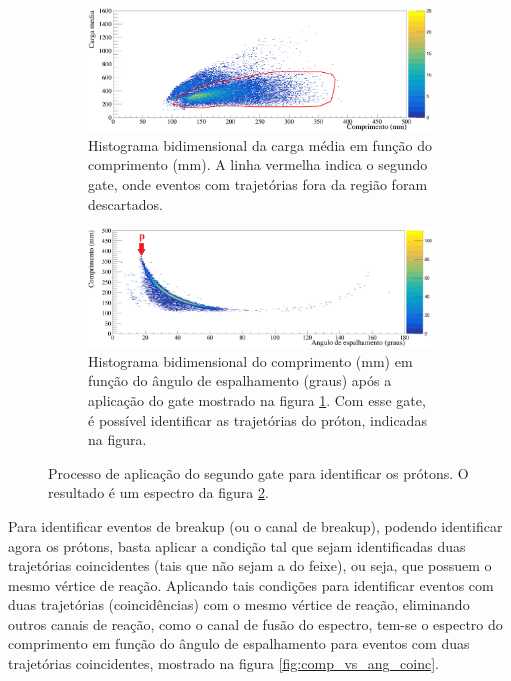 \documentclass[a4paper,12pt,oneside]{book}
\begin{document}
\begin{figure}[H]
\centering
    \begin{subfigure}[b]{\textwidth}
        \centering
        \includegraphics[scale = 0.5, width=\columnwidth]{figs/carga_media_vs_comp_cut1.png}
        \caption{Histograma bidimensional da carga média em função do comprimento (mm). A linha vermelha indica o segundo gate, onde eventos com trajetórias fora da região foram descartados.}
        \label{subfig:gate2_antes}
    \end{subfigure}%
    \hfill
    \begin{subfigure}[b]{\textwidth}
        \centering
        \includegraphics[scale=0.5, width=\columnwidth]{figs/comp_vs_ang_n2_cut12.png}
        \caption{Histograma bidimensional do comprimento (mm) em função do ângulo de espalhamento (graus) após a aplicação do gate mostrado na figura \ref{subfig:gate2_antes}. Com esse gate, é possível identificar as trajetórias do próton, indicadas na figura.}
        \label{subfig:gate2_depois}
    \end{subfigure}%
	\hfill
\caption{Processo de aplicação do segundo gate para identificar os prótons. O resultado é um espectro da figura \ref{subfig:gate2_depois}.}
\label{fig:gate_2}
\end{figure}

\par Para identificar eventos de breakup (ou o canal de breakup), podendo identificar agora os prótons, basta aplicar a condição tal que sejam identificadas duas trajetórias coincidentes (tais que não sejam a do feixe), ou seja, que possuem o mesmo vértice de reação. Aplicando tais condições para identificar eventos com duas trajetórias (coincidências) com o mesmo vértice de reação, eliminando outros canais de reação, como o canal de fusão do espectro, tem-se o espectro do comprimento em função do ângulo de espalhamento para eventos com duas trajetórias coincidentes, mostrado na figura \ref{fig:comp_vs_ang_coinc}.
\end{document}
